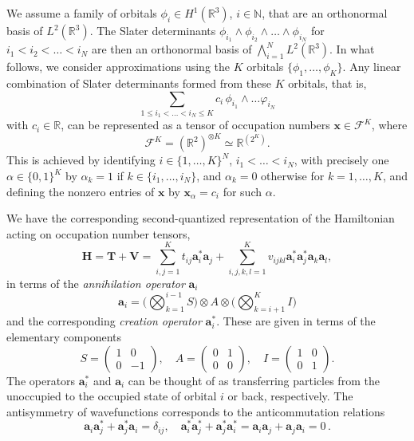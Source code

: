 \documentclass[a4paper,11pt,oneside]{amsart}
\theoremstyle{definition}
\theoremstyle{remark}
\newcommand{\R}{\mathbb{R}}
\newcommand{\N}{\mathbb{N}}
\newcommand{\ten}[1]{\boldsymbol{#1}}
\numberwithin{equation}{section}
\numberwithin{theorem}{section}
\begin{document}
We assume a family of orbitals $\phi_i \in H^1(\R^3)$, $i \in \N$, that are an orthonormal basis of $L^2(\R^3)$. The Slater determinants $\phi_{i_1} \wedge \phi_{i_2} \wedge \ldots \wedge \phi_{i_N}$ for $i_1 < i_2 < \ldots < i_N$ are then an orthonormal basis of $\bigwedge_{i=1}^N L^2(\R^3)$.
In what follows, we consider approximations using the $K$ orbitals $\{ \phi_{1},\ldots, \phi_{K} \}$.
Any linear combination of Slater determinants formed from these $K$ orbitals, that is,
\[
   \sum_{1 \leq i_1 < \ldots < i_N \leq K } c_i\, \phi_{i_1} \wedge  \ldots \varphi_{i_N}
\]
with $c_{i} \in \R$, can be represented as a tensor of occupation numbers $\ten x \in \mathcal{F}^K$, where
\[  \mathcal{F}^K = (\R^2)^{\otimes K}  \simeq \R^{(2^K)}.  \]
This is achieved by identifying $i \in \{ 1, \ldots, K\}^N$, $i_1 < \ldots < i_N$, with precisely one $\alpha \in \{ 0, 1 \}^K$ by $\alpha_k = 1$ if $k \in \{ i_1, \ldots, i_N \}$, and $\alpha_k= 0$ otherwise for $k=1,\ldots,K$, and defining the nonzero entries of $\ten x$ by $\ten x_\alpha = c_i$ for such $\alpha$. 

We have the corresponding second-quantized representation of the Hamiltonian acting on occupation number tensors,
\begin{equation}\label{eq:hamil}
    \ten{H} = \ten T + \ten V = \sum_{i,j = 1}^K t_{ij} \ten{a}_{i}^\ast \ten{a}_{j}  +  \sum_{i,j,k,l = 1}^K v_{ijkl} \ten{a}^\ast_{i} \ten{a}^\ast_{j} \ten{a}_{k} \ten{a}_{l},
\end{equation}
 in terms of the \emph{annihilation operator} $\ten{a}_i$
\begin{equation}\label{def:anniloperator}
  \ten{a}_i =  \biggl( \bigotimes_{k=1}^{i-1} S \biggr) \otimes A \otimes \biggl( \bigotimes_{k =  i + 1}^K I \biggr)
\end{equation}
and the corresponding \emph{creation operator} $\ten{a}_i^\ast$. These are given in terms of the elementary components
 \begin{equation}\label{eq:elementarycomponents}
  S = \begin{pmatrix} 1 & 0 \\ 0 & -1 \end{pmatrix}, \quad
   A = \begin{pmatrix} 0 & 1 \\ 0 & 0 \end{pmatrix}, \quad 
   I = \begin{pmatrix} 1 & 0 \\ 0 & 1 \end{pmatrix}.
\end{equation}
The operators $\ten{a}^\ast_i$ and $\ten{a}_i$ can be thought of as transferring particles from the unoccupied to the occupied state of orbital $i$ or back, respectively. The antisymmetry of wavefunctions corresponds to the anticommutation relations
 \begin{equation}\label{eq:anticomm}
     \ten{a}_{i} \ten{a}^\ast_{j} + \ten{a}^\ast_{j} \ten{a}_{i} = \delta_{ij}, \quad   \ten{a}^\ast_{i} \ten{a}^\ast_{j} + \ten{a}^\ast_{j} \ten{a}^\ast_{i} =   \ten{a}_{i} \ten{a}_{j} + \ten{a}_{j} \ten{a}_{i} = 0\,.
 \end{equation}
 
\end{document}
